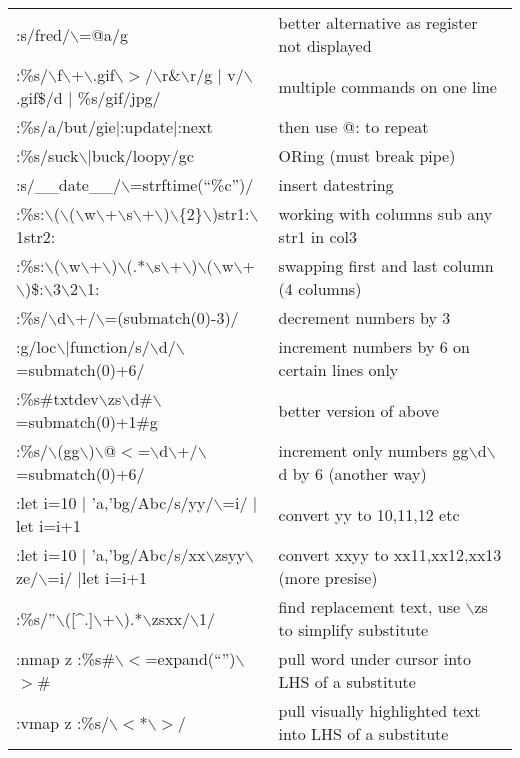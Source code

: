 \documentclass[10pt]{article}
\begin{document}
\begin{center}
\begin{longtable}{l|l}
 :s/fred/$\backslash$=@a/g & better alternative as register not displayed\\
 :\%s/$\backslash$f$\backslash$+$\backslash$.gif$\backslash$$>$/$\backslash$r\&$\backslash$r/g $|$ v/$\backslash$.gif\$/d $|$ \%s/gif/jpg/ & multiple commands on one line\\
 :\%s/a/but/gie$|$:update$|$:next & then use @: to repeat\\
 :\%s/suck$\backslash$$|$buck/loopy/gc & ORing (must break pipe)\\
 :s/\_\_date\_\_/$\backslash$=strftime(``\%c'')/ & insert datestring\\
 :\%s:$\backslash$($\backslash$($\backslash$w$\backslash$+$\backslash$s$\backslash$+$\backslash$)$\backslash$\{2\}$\backslash$)str1:$\backslash$1str2: & working with columns sub any str1 in col3\\
 :\%s:$\backslash$($\backslash$w$\backslash$+$\backslash$)$\backslash$(.*$\backslash$s$\backslash$+$\backslash$)$\backslash$($\backslash$w$\backslash$+$\backslash$)\$:$\backslash$3$\backslash$2$\backslash$1: & swapping first and last column (4 columns)\\
 :\%s/$\backslash$d$\backslash$+/$\backslash$=(submatch(0)-3)/ & decrement numbers by 3\\
 :g/loc$\backslash$$|$function/s/$\backslash$d/$\backslash$=submatch(0)+6/ & increment numbers by 6 on certain lines only\\
 :\%s\#txtdev$\backslash$zs$\backslash$d\#$\backslash$=submatch(0)+1\#g & better version of above\\
 :\%s/$\backslash$(gg$\backslash$)$\backslash$@$<$=$\backslash$d$\backslash$+/$\backslash$=submatch(0)+6/ & increment only numbers gg$\backslash$d$\backslash$d by 6 (another way)\\
 :let i=10 $|$ 'a,'bg/Abc/s/yy/$\backslash$=i/ $|$let i=i+1 & convert yy to 10,11,12 etc\\
 :let i=10 $|$ 'a,'bg/Abc/s/xx$\backslash$zsyy$\backslash$ze/$\backslash$=i/ $|$let i=i+1 & convert xxyy to xx11,xx12,xx13 (more presise) \\
 :\%s/''$\backslash$([\^{}.]$\backslash$+$\backslash$).*$\backslash$zsxx/$\backslash$1/ & find replacement text, use $\backslash$zs to simplify substitute\\
 :nmap z :\%s\#$\backslash$$<$=expand(``'')$\backslash$$>$\# & pull word under cursor into LHS of a substitute\\
 :vmap z :\%s/$\backslash$$<$*$\backslash$$>$/ & pull visually highlighted text into LHS of a substitute
\end{longtable}
\end{center}
\end{document}
